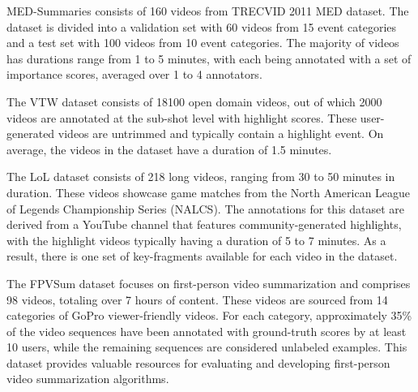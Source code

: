 MED-Summaries consists of 160 videos from TRECVID 2011 MED dataset. The dataset is divided into a validation set with 60 videos from 15 event categories and a test set with 100 videos from 10 event categories. The majority of videos has durations range from 1 to 5 minutes, with each being annotated with a set of importance scores, averaged over 1 to 4 annotators.

The VTW dataset consists of 18100 open domain videos, out of which 2000 videos are annotated at the sub-shot level with highlight scores. These user-generated videos are untrimmed and typically contain a highlight event. On average, the videos in the dataset have a duration of 1.5 minutes.

The LoL dataset consists of 218 long videos, ranging from 30 to 50 minutes in duration. These videos showcase game matches from the North American League of Legends Championship Series (NALCS). The annotations for this dataset are derived from a YouTube channel that features community-generated highlights, with the highlight videos typically having a duration of 5 to 7 minutes. As a result, there is one set of key-fragments available for each video in the dataset.

The FPVSum dataset focuses on first-person video summarization and comprises 98 videos, totaling over 7 hours of content. These videos are sourced from 14 categories of GoPro viewer-friendly videos. For each category, approximately 35\% of the video sequences have been annotated with ground-truth scores by at least 10 users, while the remaining sequences are considered unlabeled examples. This dataset provides valuable resources for evaluating and developing first-person video summarization algorithms.

